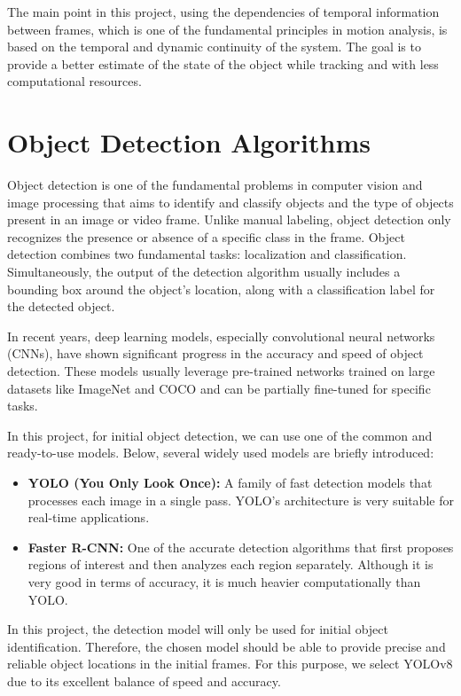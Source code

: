 \documentclass[12pt, a4paper]{article}
\begin{document}
The main point in this project, using the dependencies of temporal information between frames, which is one of the fundamental principles in motion analysis, is based on the temporal and dynamic continuity of the system. The goal is to provide a better estimate of the state of the object while tracking and with less computational resources.

\section{Object Detection Algorithms}

Object detection is one of the fundamental problems in computer vision and image processing that aims to identify and classify objects and the type of objects present in an image or video frame. Unlike manual labeling, object detection only recognizes the presence or absence of a specific class in the frame. Object detection combines two fundamental tasks: localization and classification. Simultaneously, the output of the detection algorithm usually includes a bounding box around the object's location, along with a classification label for the detected object.

In recent years, deep learning models, especially convolutional neural networks (CNNs), have shown significant progress in the accuracy and speed of object detection. These models usually leverage pre-trained networks trained on large datasets like ImageNet and COCO and can be partially fine-tuned for specific tasks.

In this project, for initial object detection, we can use one of the common and ready-to-use models. Below, several widely used models are briefly introduced:

\begin{itemize}
    \item \textbf{YOLO (You Only Look Once):} A family of fast detection models that processes each image in a single pass. YOLO's architecture is very suitable for real-time applications.
    \item \textbf{Faster R-CNN:} One of the accurate detection algorithms that first proposes regions of interest and then analyzes each region separately. Although it is very good in terms of accuracy, it is much heavier computationally than YOLO.
\end{itemize}

In this project, the detection model will only be used for initial object identification. Therefore, the chosen model should be able to provide precise and reliable object locations in the initial frames. For this purpose, we select YOLOv8 due to its excellent balance of speed and accuracy.
\end{document}
